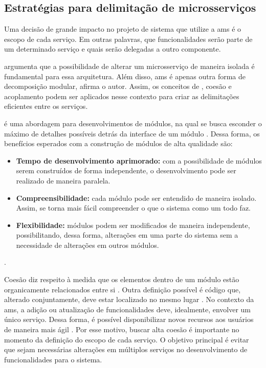 \subsection{Estratégias para delimitação de microsserviços}
Uma decisão de grande impacto no projeto de sistema que utilize a \acrshort{ams} é o escopo de cada serviço. Em outras palavras, que funcionalidades serão parte de um determinado serviço e quais serão delegadas a outro componente.

 argumenta que a possibilidade de alterar um microsserviço de maneira isolada é fundamental para essa arquitetura. Além disso, \acrshort{ams} é apenas outra forma de decomposição modular, afirma o autor. Assim, os conceitos de , coesão e acoplamento podem ser aplicados nesse contexto para criar as delimitações eficientes entre os serviços.

 é uma abordagem para desenvolvimentos de módulos, na qual se busca esconder o máximo de detalhes possíveis detrás da interface de um módulo \cite{buildingMicroservices}. Dessa forma, os benefícios esperados com a construção de módulos de alta qualidade são:
\begin{itemize}
    \item \textbf{Tempo de desenvolvimento aprimorado:} com a possibilidade de módulos serem construídos de forma independente, o desenvolvimento pode ser realizado de maneira paralela.
    \item \textbf{Compreensibilidade:} cada módulo pode ser entendido de maneira isolado. Assim, se torna mais fácil compreender o que o sistema como um todo faz.
    \item \textbf{Flexibilidade:} módulos podem ser modificados de maneira independente, possibilitando, dessa forma, alterações em uma parte do sistema sem a necessidade de alterações em outros módulos.
\end{itemize}
\cite{Parnas2012}.

Coesão diz respeito à medida que os elementos dentro de um módulo estão organicamente relacionados entre si \cite{Yourdon1979}. Outra definição possível é código que, alterado conjuntamente, deve estar localizado no mesmo lugar \cite{buildingMicroservices}. No contexto da \acrshort{ams}, a adição ou atualização de funcionalidades deve, idealmente, envolver um único serviço. Dessa forma, é possível disponibilizar novos recursos aos usuários de maneira mais ágil \cite{buildingMicroservices}. Por esse motivo, buscar alta coesão é importante no momento da definição do escopo de cada serviço. O objetivo principal é evitar que sejam necessárias alterações em múltiplos serviços no desenvolvimento de funcionalidades para o sistema.

